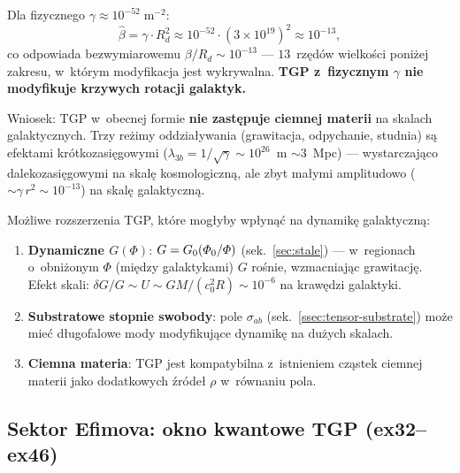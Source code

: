 \begin{remark}%
\label{rem:physical-gamma-rotation}
Dla fizycznego $\gamma \approx 10^{-52}\;\mathrm{m}^{-2}$:
\begin{equation}
  \hat\beta = \gamma \cdot R_d^2
  \approx 10^{-52} \cdot (3 \times 10^{19})^2
  \approx 10^{-13},
\end{equation}
co odpowiada bezwymiarowemu $\beta/R_d \sim 10^{-13}$
--- $13$~rz\k{e}d\'ow wielko\'sci poni\.zej zakresu,
w~kt\'orym modyfikacja jest wykrywalna.
\textbf{TGP z~fizycznym $\gamma$ nie modyfikuje krzywych
rotacji galaktyk.}

Wniosek: TGP w~obecnej formie \textbf{nie zast\k{e}puje
ciemnej materii} na skalach galaktycznych.
Trzy re\.zimy oddzia\l{}ywania (grawitacja, odpychanie,
studnia) s\k{a} efektami kr\'otkozasi\k{e}gowymi
($\lambda_{3b} = 1/\sqrt{\gamma} \sim 10^{26}$~m $\sim 3$~Mpc)
--- wystarczaj\k{a}co dalekozasi\k{e}gowymi na skal\k{e}
kosmologiczn\k{a}, ale zbyt ma\l{}ymi amplitudowo
($\sim\gamma\,r^2 \sim 10^{-13}$) na skal\k{e} galaktyczn\k{a}.
\end{remark}

\begin{remark}%
\label{rem:DM-alternatives}
Mo\.zliwe rozszerzenia TGP, kt\'ore mog\l{}yby wp\l{}yn\k{a}\'c
na dynamik\k{e} galaktyczn\k{a}:
\begin{enumerate}[nosep]
  \item \textbf{Dynamiczne $G(\Phi)$}: $G = G_0(\varPhi_0/\varPhi)$
    (sek.~\ref{sec:stale}) --- w~regionach o~obni\.zonym $\Phi$
    (mi\k{e}dzy galaktykami) $G$ ro\'snie, wzmacniaj\k{a}c
    grawitacj\k{e}. Efekt skali: $\delta G/G \sim U \sim
    GM/(c_0^2 R) \sim 10^{-6}$ na kraw\k{e}dzi galaktyki.
  \item \textbf{Substratowe stopnie swobody}: pole $\sigma_{ab}$
    (sek.~\ref{ssec:tensor-substrate}) mo\.ze mie\'c d\l{}ugo\-falowe
    mody modyfikuj\k{a}ce dynamik\k{e} na du\.zych skalach.
  \item \textbf{Ciemna materia}: TGP jest kompatybilna
    z~istnieniem cz\k{a}stek ciemnej materii jako dodatkowych
    \'zr\'ode\l{} $\rho$ w~r\'ownaniu pola.
\end{enumerate}
\end{remark}

\subsection{Sektor Efimova: okno kwantowe TGP (ex32--ex46)}%
\label{ssec:efimov-sector}


